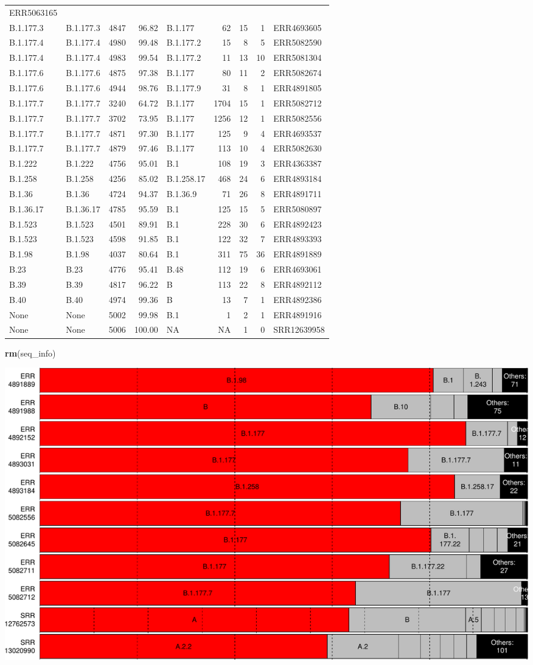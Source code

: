 \documentclass[
]{article}
\newenvironment{Shaded}{\begin{snugshade}}{\end{snugshade}}
\newcommand{\KeywordTok}[1]{\textcolor[rgb]{0.13,0.29,0.53}{\textbf{#1}}}
\newcommand{\NormalTok}[1]{#1}
\begin{document}
\begin{longtable}[]{@{}llrrlrrrl@{}}
ERR5063165\tabularnewline
B.1.177.3 & B.1.177.3 & 4847 & 96.82 & B.1.177 & 62 & 15 & 1 &
ERR4693605\tabularnewline
B.1.177.4 & B.1.177.4 & 4980 & 99.48 & B.1.177.2 & 15 & 8 & 5 &
ERR5082590\tabularnewline
B.1.177.4 & B.1.177.4 & 4983 & 99.54 & B.1.177.2 & 11 & 13 & 10 &
ERR5081304\tabularnewline
B.1.177.6 & B.1.177.6 & 4875 & 97.38 & B.1.177 & 80 & 11 & 2 &
ERR5082674\tabularnewline
B.1.177.6 & B.1.177.6 & 4944 & 98.76 & B.1.177.9 & 31 & 8 & 1 &
ERR4891805\tabularnewline
B.1.177.7 & B.1.177.7 & 3240 & 64.72 & B.1.177 & 1704 & 15 & 1 &
ERR5082712\tabularnewline
B.1.177.7 & B.1.177.7 & 3702 & 73.95 & B.1.177 & 1256 & 12 & 1 &
ERR5082556\tabularnewline
B.1.177.7 & B.1.177.7 & 4871 & 97.30 & B.1.177 & 125 & 9 & 4 &
ERR4693537\tabularnewline
B.1.177.7 & B.1.177.7 & 4879 & 97.46 & B.1.177 & 113 & 10 & 4 &
ERR5082630\tabularnewline
B.1.222 & B.1.222 & 4756 & 95.01 & B.1 & 108 & 19 & 3 &
ERR4363387\tabularnewline
B.1.258 & B.1.258 & 4256 & 85.02 & B.1.258.17 & 468 & 24 & 6 &
ERR4893184\tabularnewline
B.1.36 & B.1.36 & 4724 & 94.37 & B.1.36.9 & 71 & 26 & 8 &
ERR4891711\tabularnewline
B.1.36.17 & B.1.36.17 & 4785 & 95.59 & B.1 & 125 & 15 & 5 &
ERR5080897\tabularnewline
B.1.523 & B.1.523 & 4501 & 89.91 & B.1 & 228 & 30 & 6 &
ERR4892423\tabularnewline
B.1.523 & B.1.523 & 4598 & 91.85 & B.1 & 122 & 32 & 7 &
ERR4893393\tabularnewline
B.1.98 & B.1.98 & 4037 & 80.64 & B.1 & 311 & 75 & 36 &
ERR4891889\tabularnewline
B.23 & B.23 & 4776 & 95.41 & B.48 & 112 & 19 & 6 &
ERR4693061\tabularnewline
B.39 & B.39 & 4817 & 96.22 & B & 113 & 22 & 8 &
ERR4892112\tabularnewline
B.40 & B.40 & 4974 & 99.36 & B & 13 & 7 & 1 & ERR4892386\tabularnewline
None & None & 5002 & 99.98 & B.1 & 1 & 2 & 1 & ERR4891916\tabularnewline
None & None & 5006 & 100.00 & NA & NA & 1 & 0 &
SRR12639958\tabularnewline
\bottomrule
\end{longtable}

\begin{Shaded}
\begin{Highlighting}[]
\KeywordTok{rm}\NormalTok{(seq\_info)}
\end{Highlighting}
\end{Shaded}

\includegraphics{pangolin_results_report_files/figure-latex/pareto-1.pdf}
\end{document}
